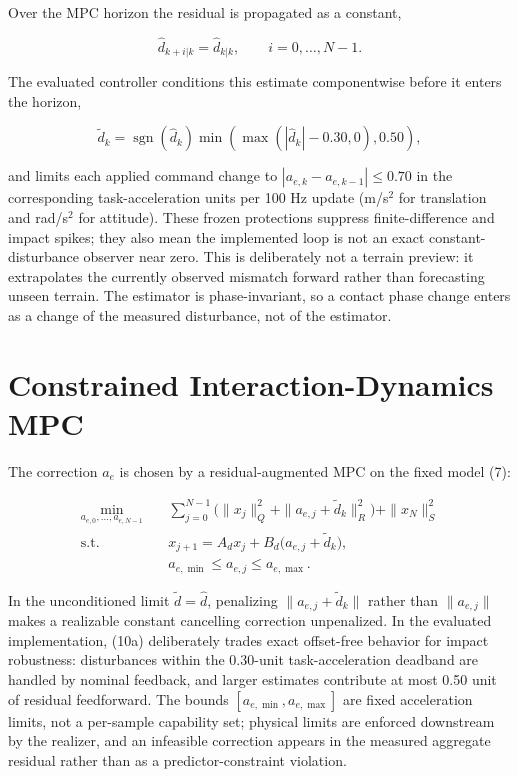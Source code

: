 \documentclass[journal]{IEEEtran}
\theoremstyle{plain}
\theoremstyle{definition}
\begin{document}
Over the MPC horizon the residual is propagated as a constant,

\[
\hat d_{k+i|k}=\hat d_{k|k},\qquad i=0,\dots,N-1 .
\tag{10}
\]

The evaluated controller conditions this estimate componentwise before it enters the horizon,

\[
\tilde d_k=\operatorname{sgn}(\hat d_k)
\min\!\left(\max\!\left(|\hat d_k|-0.30,0\right),0.50\right),
\tag{10a}
\]

and limits each applied command change to \(|a_{e,k}-a_{e,k-1}|\le0.70\) in the corresponding task-acceleration units per 100 Hz update (m/s\(^2\) for translation and rad/s\(^2\) for attitude). These frozen protections suppress finite-difference and impact spikes; they also mean the implemented loop is not an exact constant-disturbance observer near zero. This is deliberately not a terrain preview: it extrapolates the currently observed mismatch forward rather than forecasting unseen terrain. The estimator is phase-invariant, so a contact phase change enters as a change of the measured disturbance, not of the estimator.

\section{Constrained Interaction-Dynamics MPC}\label{sec:mpc}

The correction \(a_e\) is chosen by a residual-augmented MPC on the fixed model (7):

\[
\begin{aligned}
\min_{a_{e,0},\dots,a_{e,N-1}}\quad&
\sum_{j=0}^{N-1}\Big(\|x_j\|_Q^2+\|a_{e,j}+\tilde d_k\|_R^2\Big)+\|x_N\|_S^2\\
\text{s.t.}\quad&
x_{j+1}=A_dx_j+B_d\big(a_{e,j}+\tilde d_k\big),\\
&a_{e,\min}\le a_{e,j}\le a_{e,\max}.
\end{aligned}
\tag{11}
\]

In the unconditioned limit \(\tilde d=\hat d\), penalizing \(\|a_{e,j}+\tilde d_k\|\) rather than \(\|a_{e,j}\|\) makes a realizable constant cancelling correction unpenalized. In the evaluated implementation, (10a) deliberately trades exact offset-free behavior for impact robustness: disturbances within the 0.30-unit task-acceleration deadband are handled by nominal feedback, and larger estimates contribute at most 0.50 unit of residual feedforward. The bounds \([a_{e,\min},a_{e,\max}]\) are fixed acceleration limits, not a per-sample capability set; physical limits are enforced downstream by the realizer, and an infeasible correction appears in the measured aggregate residual rather than as a predictor-constraint violation.
\end{document}
